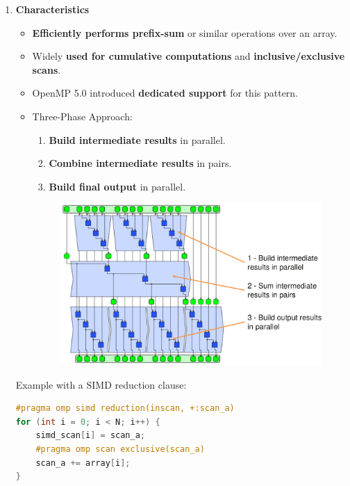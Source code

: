 \begin{enumerate}
    \item {}
    \begin{flushleft}
        \textcolor{Green3}{ \textbf{Characteristics}}
    \end{flushleft}
    \begin{itemize}
        \item \textbf{Efficiently performs prefix-sum} or similar operations over an array.
        \item Widely \textbf{used for cumulative computations} and \textbf{inclusive/exclusive scans}.
        \item OpenMP 5.0 introduced \textbf{dedicated support} for this pattern.
        \item Three-Phase Approach:
        \begin{enumerate}
            \item \textbf{Build intermediate results} in parallel.
            \item \textbf{Combine intermediate results} in pairs.
            \item \textbf{Build final output} in parallel.
        \end{enumerate}
        \begin{figure}[!htp]
            \centering
            \includegraphics[width=.9\textwidth]{img/scan-pattern-2.pdf}
        \end{figure}
    \end{itemize}
    \begin{examplebox}
        Example with a SIMD reduction clause:
        \begin{lstlisting}[language=c++]
#pragma omp simd reduction(inscan, +:scan_a)
for (int i = 0; i < N; i++) {
    simd_scan[i] = scan_a; 
    #pragma omp scan exclusive(scan_a)
    scan_a += array[i];
}\end{lstlisting}
    \end{examplebox}
\end{enumerate}
